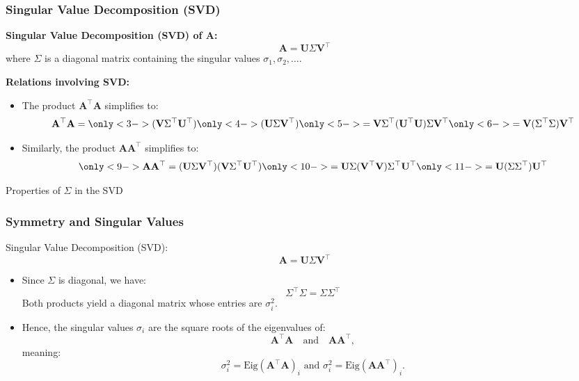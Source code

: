 \documentclass[aspectratio=169]{beamer}
\begin{document}
\begin{frame}
\frametitle{Singular Value Decomposition (SVD)}

\textbf{Singular Value Decomposition (SVD) of \( \mathbf{A} \):}
\[
\mathbf{A} = \mathbf{U} \Sigma \mathbf{V}^\top
\]
where \(\Sigma\) is a diagonal matrix containing the singular values \(\sigma_1, \sigma_2, \dots\).

\pause
\textbf{Relations involving SVD:}

\begin{itemize}
    \item<2-> The product \( \mathbf{A}^\top \mathbf{A} \) simplifies to:
    \[
    {\mathbf{A}^\top \mathbf{A} = 
    \only<3->{ (\mathbf{V} \Sigma^\top \mathbf{U}^\top) \only<4->{(\mathbf{U} \Sigma \mathbf{V}^\top)}}}
    \only<5->{= \mathbf{V} \Sigma^\top (\mathbf{U}^\top \mathbf{U}) \Sigma \mathbf{V}^\top}
    \only<6->{= \mathbf{V} (\Sigma^\top \Sigma) \mathbf{V}^\top}
    \]


    \pause
    \item<8-> Similarly, the product \( \mathbf{A} \mathbf{A}^\top \) simplifies to:
    \[
    \only<9->{\mathbf{A} \mathbf{A}^\top = (\mathbf{U} \Sigma \mathbf{V}^\top)(\mathbf{V} \Sigma^\top \mathbf{U}^\top)}
    \only<10->{= \mathbf{U} \Sigma (\mathbf{V}^\top \mathbf{V}) \Sigma^\top \mathbf{U}^\top}
    \only<11->{= \mathbf{U} (\Sigma \Sigma^\top) \mathbf{U}^\top}
    \]

\end{itemize}
\end{frame}

\begin{frame}{Properties of \(\Sigma\) in the SVD}
\frametitle{Symmetry and Singular Values}

Singular Value Decomposition (SVD):
\[
\mathbf{A} = \mathbf{U} \Sigma \mathbf{V}^\top
\]

\begin{itemize}
    \item<2-> Since \(\Sigma\) is diagonal, we have:
    \[
    \Sigma^\top \Sigma = \Sigma \Sigma^\top
    \]
    Both products yield a diagonal matrix whose entries are \(\sigma_i^2\).

    \item<3-> Hence, the singular values \(\sigma_i\) are the square roots of the eigenvalues of:
    \[
    \mathbf{A}^\top \mathbf{A} \quad \text{and} \quad \mathbf{A} \mathbf{A}^\top,
    \]
    meaning:
    \[
    \sigma_i^2 = \text{Eig}(\mathbf{A}^\top \mathbf{A})_i \text{ and } \sigma_i^2 = \text{Eig}(\mathbf{A} \mathbf{A}^\top)_i.
    \]

\end{itemize}

\end{frame}
\end{document}
